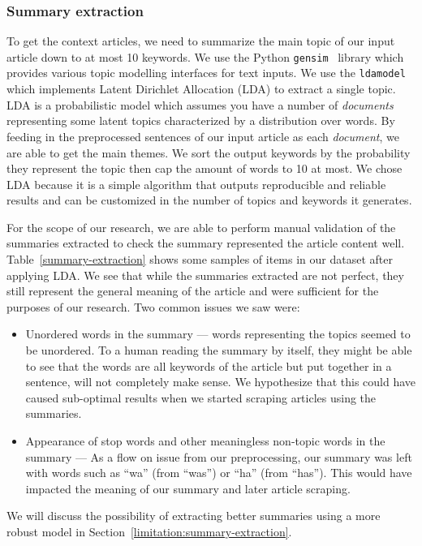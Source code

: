 \documentclass{article}
\begin{document}
\subsubsection{Summary extraction} \label{section:summary-extraction}

To get the context articles, we need to summarize the main topic of our input article down to at most 10 keywords. We use the Python \verb|gensim|~\cite{py-gensim} library which provides various topic modelling interfaces for text inputs. We use the \verb|ldamodel| which implements Latent Dirichlet Allocation (LDA) to extract a single topic. LDA is a probabilistic model which assumes you have a number of \emph{documents} representing some latent topics characterized by a distribution over words. By feeding in the preprocessed sentences of our input article as each \emph{document}, we are able to get the main themes. We sort the output keywords by the probability they represent the topic then cap the amount of words to 10 at most. We chose LDA because it is a simple algorithm that outputs reproducible and reliable results and can be customized in the number of topics and keywords it generates.

For the scope of our research, we are able to perform manual validation of the summaries extracted to check the summary represented the article content well. Table~\ref{summary-extraction} shows some samples of items in our dataset after applying LDA. We see that while the summaries extracted are not perfect, they still represent the general meaning of the article and were sufficient for the purposes of our research. Two common issues we saw were:
\begin{itemize}
  \item Unordered words in the summary --- words representing the topics seemed to be unordered. To a human reading the summary by itself, they might be able to see that the words are all keywords of the article but put together in a sentence, will not completely make sense. We hypothesize that this could have caused sub-optimal results when we started scraping articles using the summaries.
  \item Appearance of stop words and other meaningless non-topic words in the summary --- As a flow on issue from our preprocessing, our summary was left with words such as ``wa'' (from ``was'') or ``ha'' (from ``has''). This would have impacted the meaning of our summary and later article scraping.\label{summary-extraction:bad-words}
\end{itemize}
We will discuss the possibility of extracting better summaries using a more robust model in Section~\ref{limitation:summary-extraction}.
\end{document}
